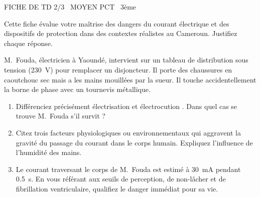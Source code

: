 \documentclass[11pt]{article}
\begin{document}
\begin{tcolorbox}[enhanced,colback=popink,colframe=popink,arc=10pt,boxrule=0pt,left=12pt,right=12pt,top=9pt,bottom=9pt]
{\color{white}\popxbold\small FICHE DE TD 2/3 \textbullet\ MOYEN \hfill PCT \textbullet\ 3ème\par}
\end{tcolorbox}
\vspace{4pt}
\noindent Cette fiche évalue votre maîtrise des dangers du courant électrique et des dispositifs de protection dans des contextes réalistes au Cameroun. Justifiez chaque réponse.

\begin{exercice}
M.~Fouda, électricien à Yaoundé, intervient sur un tableau de distribution sous tension (\SI{230}{V}) pour remplacer un disjoncteur. Il porte des chaussures en caoutchouc sec mais a les mains mouillées par la sueur. Il touche accidentellement la borne de phase avec un tournevis métallique.
\begin{enumerate}
    \item[2 pts] Différenciez précisément \og électrisation \fg{} et \og électrocution \fg{}. Dans quel cas se trouve M.~Fouda s'il survit ? 
    \item[2 pts] Citez trois facteurs physiologiques ou environnementaux qui aggravent la gravité du passage du courant dans le corps humain. Expliquez l'influence de l'humidité des mains.
    \item[2 pts] Le courant traversant le corps de M.~Fouda est estimé à \SI{30}{mA} pendant \SI{0,5}{s}. En vous référant aux seuils de perception, de non-lâcher et de fibrillation ventriculaire, qualifiez le danger immédiat pour sa vie.
\end{enumerate}
\end{exercice}
\end{document}
